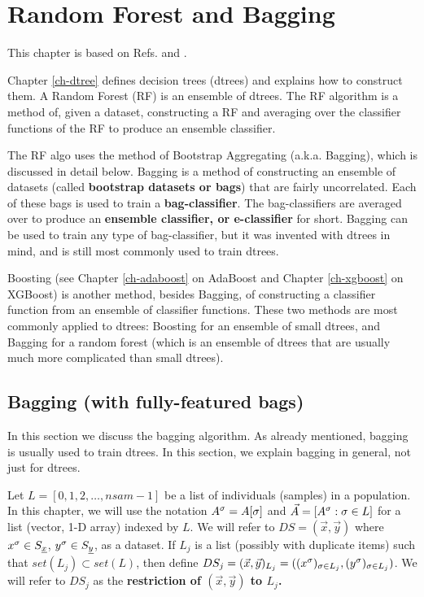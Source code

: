 \chapter{Random Forest and Bagging}
\label{ch-rforest}


This chapter
is based on Refs.\cite{wiki-bagging}
and \cite{wiki-rforest}.

Chapter \ref{ch-dtree}
defines decision trees (dtrees)
and explains how to construct them.
A Random Forest (RF) is 
an ensemble
of dtrees.
The RF algorithm is a
method of,
given a dataset,
constructing a RF
and averaging
over the classifier 
functions of the RF
to produce
an ensemble classifier.


The RF algo
uses  the method of 
Bootstrap Aggregating
(a.k.a. Bagging), which
is discussed in detail below.
Bagging
is a method
of constructing
an ensemble
of datasets (called {\bf bootstrap
datasets or bags})
that are 
fairly uncorrelated.
Each of
these bags is used to
train a {\bf bag-classifier}.
The bag-classifiers
are averaged over
to produce an {\bf
ensemble classifier,
or e-classifier} for short.
Bagging can be used
to
train any type
of bag-classifier,
but it was 
invented with
dtrees
in mind, 
and is still
 most commonly
used to train dtrees.

Boosting
(see Chapter \ref{ch-adaboost} on AdaBoost
and
Chapter \ref{ch-xgboost} on XGBoost)
is
another method,
besides Bagging,
of constructing a classifier function
from an ensemble 
of classifier functions.
These two methods are most commonly
applied to dtrees: Boosting for an ensemble of
small dtrees, and Bagging for a
random forest (which
is an ensemble
of dtrees that are 
usually much more
complicated than small dtrees).



\section{Bagging (with fully-featured bags)}
In this section
we discuss the bagging
algorithm.
As already 
mentioned,
bagging
is usually
used to train dtrees.
In this
section,
we explain bagging
in general,
not just for dtrees.


Let $L=[0,1,2, \ldots, nsam-1]$ be a list of
individuals (samples) in a population.
In this chapter, we will use the notation 
$A^\sigma=A[\sigma]$ 
and $\vec{A}=[A^\sigma:\sigma\in L]$
for a  list (vector, 1-D  array) indexed by $L$.
We will refer to $DS=(\vec{x}, \vec{y})$ 
where $x^\sigma\in S_{\underline{x}}$, $y^\sigma\in S_{\underline{y}}$,
as a dataset. If
$L_j$ is a list (possibly with 
duplicate items)
such that $set(L_j)\subset set(L)$,
 then
define
$DS_j=(\vec{x}, \vec{y})_{L_j}=
((x^\sigma)_{\sigma\in L_j}, 
(y^\sigma)_{\sigma\in L_j})$.
We will
refer to $DS_j$
as the {\bf restriction of 
$(\vec{x}, \vec{y})$ to $L_j$.}



